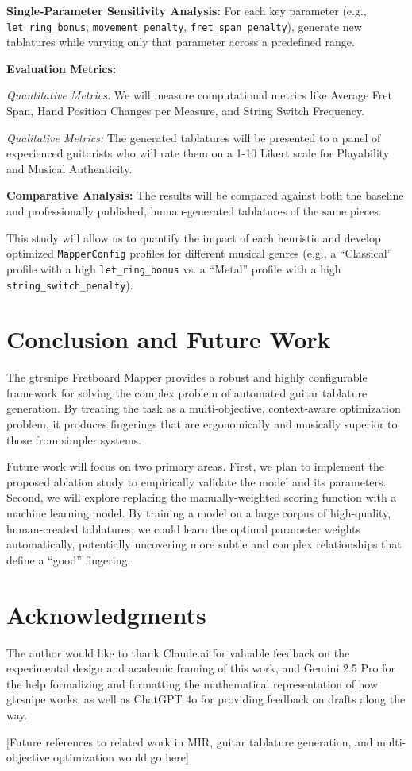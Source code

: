 \documentclass[conference]{IEEEtran}
\begin{document}
\textbf{Single-Parameter Sensitivity Analysis:} For each key parameter (e.g., \texttt{let\_ring\_bonus}, \texttt{movement\_penalty}, \texttt{fret\_span\_penalty}), generate new tablatures while varying only that parameter across a predefined range.

\textbf{Evaluation Metrics:}

\textit{Quantitative Metrics:} We will measure computational metrics like Average Fret Span, Hand Position Changes per Measure, and String Switch Frequency.

\textit{Qualitative Metrics:} The generated tablatures will be presented to a panel of experienced guitarists who will rate them on a 1-10 Likert scale for Playability and Musical Authenticity.

\textbf{Comparative Analysis:} The results will be compared against both the baseline and professionally published, human-generated tablatures of the same pieces.

This study will allow us to quantify the impact of each heuristic and develop optimized \texttt{MapperConfig} profiles for different musical genres (e.g., a ``Classical'' profile with a high \texttt{let\_ring\_bonus} vs. a ``Metal'' profile with a high \texttt{string\_switch\_penalty}).

\section{Conclusion and Future Work}

The gtrsnipe Fretboard Mapper provides a robust and highly configurable framework for solving the complex problem of automated guitar tablature generation. By treating the task as a multi-objective, context-aware optimization problem, it produces fingerings that are ergonomically and musically superior to those from simpler systems.

Future work will focus on two primary areas. First, we plan to implement the proposed ablation study to empirically validate the model and its parameters. Second, we will explore replacing the manually-weighted scoring function with a machine learning model. By training a model on a large corpus of high-quality, human-created tablatures, we could learn the optimal parameter weights automatically, potentially uncovering more subtle and complex relationships that define a ``good'' fingering.

\section*{Acknowledgments}
The author would like to thank Claude.ai for valuable feedback on the experimental design and academic framing of this work, and Gemini 2.5 Pro for the help formalizing and formatting the mathematical representation of how gtrsnipe works, as well as ChatGPT 4o for providing feedback on drafts along the way.

\begin{thebibliography}{1}

[Future references to related work in MIR, guitar tablature generation, and multi-objective optimization would go here]

\end{thebibliography}
\end{document}
